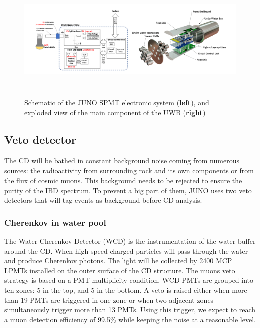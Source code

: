 \documentclass[../main.tex]{subfiles}
\begin{document}
\begin{figure}[ht]
  \centering
  \includegraphics[height=6cm]{images/juno/SPMT_readout.png}
  \caption{Schematic of the JUNO SPMT electronic system (\textbf{left}), and exploded view of the main component of the UWB (\textbf{right})}
  \label{fig:juno:spmt_elec}
\end{figure}

\subsection{Veto detector}

The CD will be bathed in constant background noise coming from numerous sources: the radioactivity from surrounding rock and its own components or from the flux of cosmic muons. This background needs to be rejected to ensure the purity of the IBD spectrum. To prevent a big part of them, JUNO uses two veto detectors that will tag events as background before CD analysis.

\subsubsection{Cherenkov in water pool}

The Water Cherenkov Detector (WCD) is the instrumentation of the water buffer around the CD. When high-speed charged particles will pass through the water and produce Cherenkov photons. The light will be collected by 2400 MCP LPMTs installed on the outer surface of the CD structure. The muons veto strategy is based on a PMT multiplicity condition. WCD PMTs are grouped into ten zones: 5 in the top, and 5 in the bottom. A veto is raised either when more than 19 PMTs are triggered in one zone or when two adjacent zones simultaneously trigger more than 13 PMTs. Using this trigger, we expect to reach a muon detection efficiency of 99.5\% while keeping the noise at a reasonable level.
\end{document}
